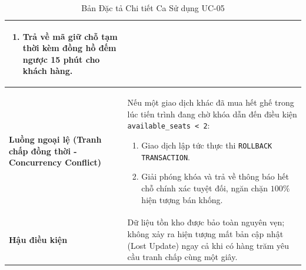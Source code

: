 \begin{table}[h!]
\begin{tabular}{|p{3.2cm}|p{11.5cm}|}
\begin{enumerate}
    \item Trả về mã giữ chỗ tạm thời kèm đồng hồ đếm ngược 15 phút cho khách hàng.
\end{enumerate} \\
\hline
\textbf{Luồng ngoại lệ (Tranh chấp đồng thời - Concurrency Conflict)} & 
Nếu một giao dịch khác đã mua hết ghế trong lúc tiến trình đang chờ khóa dẫn đến điều kiện \texttt{available\_seats < 2}:
\begin{enumerate}
    \item Giao dịch lập tức thực thi \texttt{ROLLBACK TRANSACTION}.
    \item Giải phóng khóa và trả về thông báo hết chỗ chính xác tuyệt đối, ngăn chặn $100\%$ hiện tượng bán khống.
\end{enumerate} \\
\hline
\textbf{Hậu điều kiện} & Dữ liệu tồn kho được bảo toàn nguyên vẹn; không xảy ra hiện tượng mất bản cập nhật (Lost Update) ngay cả khi có hàng trăm yêu cầu tranh chấp cùng một giây. \\
\hline
\end{tabular}
\caption{Bản Đặc tả Chi tiết Ca Sử dụng UC-05}
\label{tab:spec_uc05}
\end{table}
